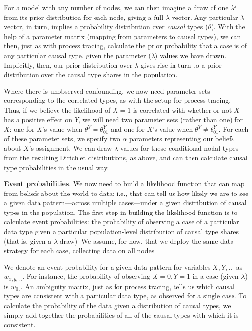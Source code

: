 \documentclass[12pt,]{book}
\begin{document}
For a model with any number of nodes, we can then imagine a draw of one \(\lambda^j\) from its prior distribution for each node, giving a full \(\lambda\) vector. Any particular \(\lambda\) vector, in turn, implies a probability distribution over \emph{causal} types (\(\theta\)). With the help of a parameter matrix (mapping from parameters to causal types), we can then, just as with process tracing, calculate the prior probability that a case is of any particular causal type, given the parameter (\(\lambda\)) values we have drawn. Implicitly, then, our prior distribution over \(\lambda\) gives rise in turn to a prior distribution over the causal type shares in the population.

Where there is unobserved confounding, we now need parameter sets corresponding to the correlated types, as with the setup for process tracing. Thus, if we believe the likelihood of \(X=1\) is correlated with whether or not \(X\) has a positive effect on \(Y\), we will need two parameter sets (rather than one) for \(X\): one for \(X\)'s value when \(\theta^Y = \theta^Y_{01}\) and one for \(X\)'s value when \(\theta^Y \neq \theta^Y_{01}\). For each of these parameter sets, we specify two \(\alpha\) parameters representing our beliefs about \(X\)'s assignment. We can draw \(\lambda\) values for these conditional nodal types from the resulting Dirichlet distributions, as above, and can then calculate causal type probabilities in the usual way.

\textbf{Event probabilities}. We now need to build a likelihood function that can map from beliefs about the world to data: i.e., that can tell us how likely we are to see a given data pattern---across multiple cases---under a given distribution of causal types in the population. The first step in building the likelihood function is to calculate event probabilities: the probability of observing a case of a particular data type given a particular population-level distribution of causal type shares (that is, given a \(\lambda\) draw). We assume, for now, that we deploy the same data strategy for each case, collecting data on all nodes.

We denote an event probability for a given data pattern for variables \(X, Y, \dots\) as \(w_{x, y, \dots}\). For instance, the probability of observing \(X=0, Y=1\) in a case (given \(\lambda\)) is \(w_{01}\). An ambiguity matrix, just as for process tracing, tells us which causal types are consistent with a particular data type, as observed for a single case. To calculate the probability of the data given a distribution of causal types, we simply add together the probabilities of all of the causal types with which it is consistent.
\end{document}
